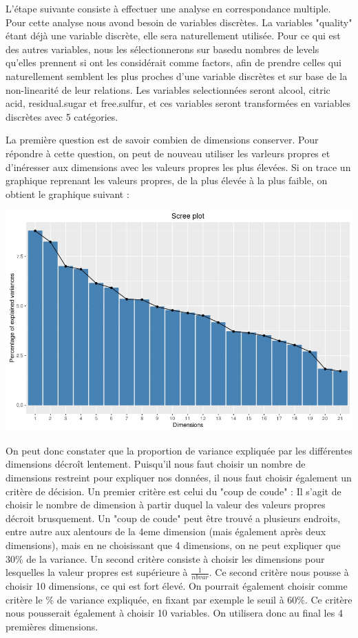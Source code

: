 \documentclass[11pt,a4paper]{article}
\begin{document}
L'étape suivante consiste à effectuer une analyse en correspondance multiple. Pour cette analyse nous avond besoin de variables discrètes. La variables "quality" étant déjà une variable discrète, elle sera naturellement utilisée. Pour ce qui est des autres variables, nous les sélectionnerons sur basedu nombres de levels qu'elles prennent si ont les considérait comme factors, afin de prendre celles qui naturellement semblent les plus proches d'une variable discrètes et sur base de la non-linearité de leur relations. Les variables selectionnées seront alcool, citric acid, residual.sugar et free.sulfur, et ces variables seront transformées en variables discrètes avec 5 catégories.

La première question est de savoir combien de  dimensions conserver. Pour répondre à cette question, on peut de nouveau utiliser les varleurs propres et d'inéresser aux dimensions avec les valeurs propres les plus élevées. Si on trace un graphique reprenant les valeurs propres, de la plus élevée à la plus faible, on obtient le graphique suivant : 

\begin{center}
\includegraphics[scale=0.4]{"mca-eigen"}
\end{center}

On peut donc constater que la proportion de variance expliquée par les différentes dimensions décroît lentement. Puisqu'il nous faut choisir un nombre de dimensions restreint pour expliquer nos données, il nous faut choisir également un critère de décision. Un premier critère est celui du "coup de coude" : Il s'agit de choisir le nombre de dimension à partir duquel la valeur des valeurs propres décroit brusquement. Un "coup de coude" peut être trouvé a plusieurs endroits, entre autre aux alentours de la 4eme dimension (mais également après deux dimensions), mais en ne choisissant que 4 dimensions, on ne peut expliquer que 30\% de la variance. Un second critère consiste à choisir les dimensions pour lesquelles la valeur propres est supérieure à $\frac{1}{nbvar}$. Ce second critère nous pousse à choisir 10 dimensions, ce qui est fort élevé. On pourrait également choisir comme critère le \% de variance expliquée, en fixant par exemple le seuil à 60\%. Ce critère nous pousserait également à choisir 10 variables. On utilisera  donc au final les 4 premières dimensions.\bigskip
\end{document}
